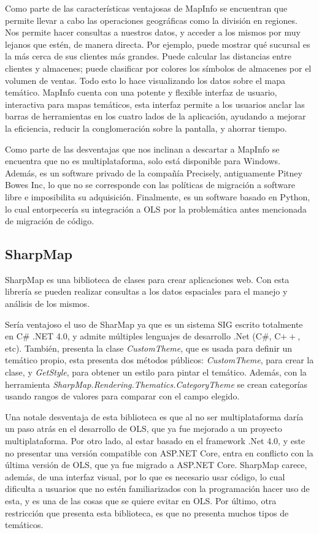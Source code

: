 Como parte de las caracter\'isticas ventajosas de MapInfo se encuentran que permite llevar a cabo las operaciones geogr\'aficas
como la divisi\'on en regiones. Nos permite hacer consultas a nuestros datos, y acceder a los mismos por muy lejanos que est\'en, de manera directa. Por ejemplo, puede mostrar qu\'e sucursal es la m\'as cerca de sus clientes m\'as grandes. Puede calcular
las distancias entre clientes y almacenes; puede clasificar por colores los s\'imbolos de almacenes por el volumen de ventas. Todo esto lo hace visualizando los datos sobre el mapa tem\'atico. MapInfo cuenta con una potente y flexible interfaz de usuario, interactiva para mapas tem\'aticos, esta interfaz permite a los usuarios anclar las barras de herramientas en los cuatro lados de la aplicaci\'on, ayudando a mejorar la eficiencia, reducir la conglomeraci\'on sobre la pantalla, y ahorrar tiempo.

Como parte de las desventajas que nos inclinan a descartar a MapInfo se encuentra que no es multiplataforma, solo est\'a disponible para Windows. Adem\'as, es un software privado de la compa\~n\'ia Precisely, antiguamente Pitney Bowes Inc, lo que no se corresponde con las pol\'iticas de migraci\'on a software libre e imposibilita su adquisici\'on. Finalmente, es un software basado en Python, lo cual entorpecer\'ia su integraci\'on a OLS por la problem\'atica antes mencionada de migraci\'on de c\'odigo.


\subsection{SharpMap}
SharpMap es una biblioteca de clases para crear aplicaciones web. Con esta librer\'ia se pueden realizar consultas a los datos espaciales para el manejo y an\'alisis de los mismos.

Ser\'ia ventajoso el uso de SharMap ya que es un sistema SIG escrito totalmente en C\# .NET 4.0, y admite m\'ultiples lenguajes de desarrollo .Net (C\#, C$++$, etc). Tambi\'en, presenta la clase \textit{CustomTheme}, que es usada para definir un tem\'atico propio, esta presenta dos m\'etodos p\'ublicos: \textit{CustomTheme}, para crear la clase, y \textit{GetStyle}, para obtener un estilo para pintar el tem\'atico. Adem\'as, con la herramienta \textit{SharpMap.Rendering.Thematics.CategoryTheme} se crean categor\'ias usando rangos de valores para comparar con el campo elegido. 

Una notale desventaja de esta biblioteca es que al no ser multiplataforma dar\'ia un paso atr\'as en el desarrollo de OLS, que ya
fue mejorado a un proyecto multiplataforma. Por otro lado, al estar basado en el framework .Net 4.0, y este no presentar una versi\'on compatible con ASP.NET Core, entra en conflicto con la \'ultima versi\'on de OLS, que ya fue migrado a ASP.NET Core. SharpMap carece, adem\'as, de una interfaz visual, por lo que es necesario usar c\'odigo, lo cual dificulta a usuarios que no est\'en familiarizados con la programaci\'on hacer uso de esta, y es una de las cosas que se quiere evitar en OLS. Por \'ultimo, otra restricci\'on que presenta esta biblioteca, es que no presenta muchos tipos de tem\'aticos.




